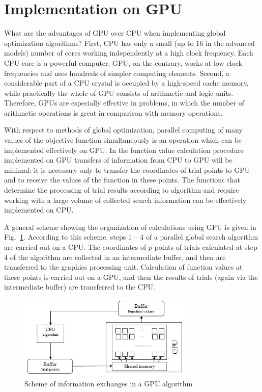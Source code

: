 \documentclass[smallcondensed]{svjour3}     %
\begin{document}
\section{Implementation on GPU} \label{sec:5}

What are the advantages of GPU over CPU when implementing global optimization algorithms? First, CPU has only a small (up to $16$ in the advanced models) number of cores working independently at a high clock frequency. Each CPU core is a powerful computer. GPU, on the contrary, works at low clock frequencies and uses hundreds of simpler computing elements. Second, a considerable part of a CPU crystal is occupied by a high-speed cache memory, while practically the whole of GPU consists of arithmetic and logic units. Therefore, GPUs are especially effective in problems, in which the number of arithmetic operations is great in comparison with memory operations.

With respect to methods of global optimization, parallel computing of many values of the objective function simultaneously is an operation which can be implemented effectively on GPU. In the function value calculation procedure implemented on GPU transfers of information from CPU to GPU will be minimal: it is necessary only to transfer the coordinates of trial points to GPU and to receive the values of the function in these points. The functions that determine the processing of trial results according to algorithm and require working with a large volume of collected search information can be effectively implemented on CPU.

A general scheme showing the organization of calculations using GPU is given in Fig.~\ref{fig:3}. According to this scheme, steps 1 -- 4 of a parallel global search algorithm are carried out on a CPU. The coordinates of $p$ points of trials calculated at step 4 of the algorithm are collected in an intermediate buffer, and then are transferred to the graphics processing unit. Calculation of function values at these points is carried out on a GPU, and then the results of trials (again via the intermediate buffer) are transferred to the CPU.

\begin{figure}
	\center
  \includegraphics[width=0.75\textwidth]{fig3.jpg} 
  \caption{Scheme of information exchanges in a GPU algorithm}
  \label{fig:3}
\end{figure}
\end{document}
